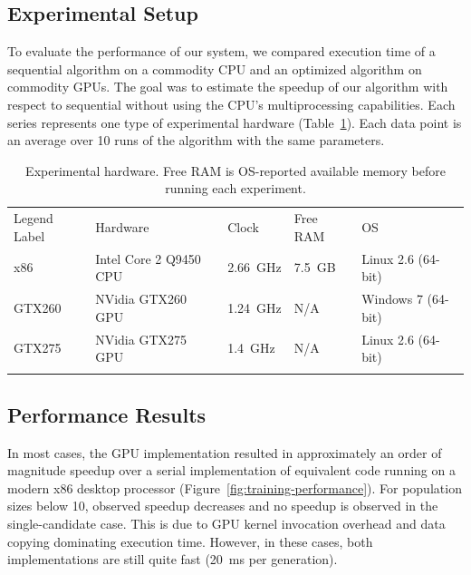 \documentclass[letterpaper]{jpconf}       %
\begin{document}
\subsection{Experimental Setup} \label{experiment}
To evaluate the performance of our system, we compared execution time of a sequential algorithm on a commodity CPU and an optimized algorithm on commodity GPUs. The goal was to estimate the speedup of our algorithm with respect to sequential without using the CPU's multiprocessing capabilities. Each series represents one type of experimental hardware (Table~\ref{tab:experimental-hardware}). Each data point is an average over 10 runs of the algorithm with the same parameters.

\begin{table}[h]
	\caption{\label{tab:experimental-hardware}Experimental hardware. Free RAM is OS-reported available memory before running each experiment.}
	\begin{center}
	\begin{tabular}{lllll}
	\br
	Legend Label & Hardware & Clock & Free RAM & OS\\
	\mr
	x86    & Intel Core 2 Q9450 CPU & 2.66~GHz & 7.5~GB & Linux 2.6 (64-bit) \\
	GTX260 & NVidia GTX260 GPU      & 1.24~GHz & N/A    & Windows 7 (64-bit) \\
	GTX275 & NVidia GTX275 GPU      & 1.4~GHz  & N/A    & Linux 2.6 (64-bit) \\
	\br
	\end{tabular}
	\end{center}
\end{table}

\subsection{Performance Results} \label{performance}
In most cases, the GPU implementation resulted in approximately an order of magnitude speedup over a serial implementation of equivalent code running on a modern x86 desktop processor (Figure~\ref{fig:training-performance}). For population sizes below 10, observed speedup decreases and no speedup is observed in the single-candidate case. This is due to GPU kernel invocation overhead and data copying dominating execution time. However, in these cases, both implementations are still quite fast (20~ms per generation).
\end{document}
